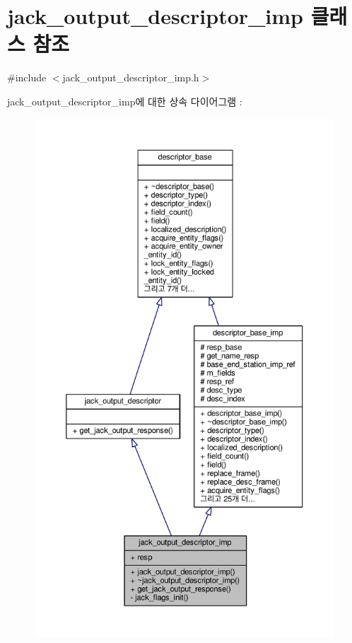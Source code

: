 \hypertarget{classavdecc__lib_1_1jack__output__descriptor__imp}{}\section{jack\+\_\+output\+\_\+descriptor\+\_\+imp 클래스 참조}
\label{classavdecc__lib_1_1jack__output__descriptor__imp}


{\ttfamily \#include $<$jack\+\_\+output\+\_\+descriptor\+\_\+imp.\+h$>$}



jack\+\_\+output\+\_\+descriptor\+\_\+imp에 대한 상속 다이어그램 \+: 
\nopagebreak
\begin{figure}[H]
\begin{center}
\leavevmode
\includegraphics[height=550pt]{classavdecc__lib_1_1jack__output__descriptor__imp__inherit__graph}
\end{center}
\end{figure}



